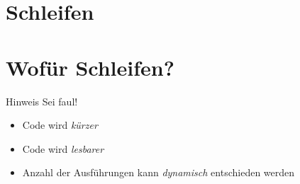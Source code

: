 




\section{Schleifen}
\subtitle{Kapitel 4: Befehle wiederholen}
\maketitle


\section{Wofür Schleifen?}
\begin{frame}
    \slidehead

\end{frame}

\begin{frame}
    \slidehead

    \pause
    \begin{block}{Hinweis}
        Sei faul!
    \end{block}
\end{frame}

\begin{frame}
    \slidehead

    \begin{itemize}
        \item Code wird \textit{kürzer}
        \item Code wird \textit{lesbarer}
        \item Anzahl der Ausführungen kann \textit{dynamisch} entschieden werden
    \end{itemize}
\end{frame}


